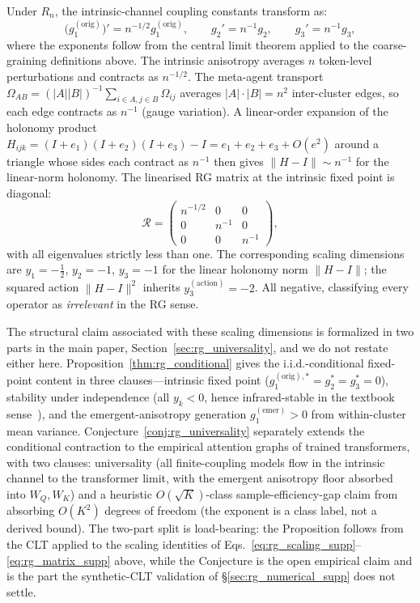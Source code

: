 \documentclass[twoside,11pt]{article}
\begin{document}
Under $R_n$, the intrinsic-channel coupling constants transform as:
\begin{equation}
\bigl(g_1^{(\mathrm{orig})}\bigr)' = n^{-1/2} g_1^{(\mathrm{orig})}, \qquad g_2' = n^{-1} g_2, \qquad g_3' = n^{-1} g_3,
\label{eq:rg_scaling_supp}
\end{equation}
where the exponents follow from the central limit theorem applied to the coarse-graining definitions above. The intrinsic anisotropy averages $n$ token-level perturbations and contracts as $n^{-1/2}$. The meta-agent transport $\Omega_{AB} = (|A||B|)^{-1}\sum_{i\in A, j\in B}\Omega_{ij}$ averages $|A|\cdot|B| = n^2$ inter-cluster edges, so each edge contracts as $n^{-1}$ (gauge variation). A linear-order expansion of the holonomy product $H_{ijk} = (I + e_1)(I + e_2)(I + e_3) - I = e_1 + e_2 + e_3 + O(e^2)$ around a triangle whose sides each contract as $n^{-1}$ then gives $\|H - I\| \sim n^{-1}$ for the linear-norm holonomy. The linearised RG matrix at the intrinsic fixed point is diagonal:
\begin{equation}
\mathcal{R} = \begin{pmatrix} n^{-1/2} & 0 & 0 \\ 0 & n^{-1} & 0 \\ 0 & 0 & n^{-1} \end{pmatrix},
\label{eq:rg_matrix_supp}
\end{equation}
with all eigenvalues strictly less than one. The corresponding scaling dimensions are $y_1 = -\tfrac{1}{2}$, $y_2 = -1$, $y_3 = -1$ for the linear holonomy norm $\|H-I\|$; the squared action $\|H-I\|^2$ inherits $y_3^{(\mathrm{action})} = -2$. All negative, classifying every operator as \emph{irrelevant} in the RG sense.

The structural claim associated with these scaling dimensions is formalized in two parts in the main paper, Section~\ref{sec:rg_universality}, and we do not restate either here. Proposition~\ref{thm:rg_conditional} gives the i.i.d.-conditional fixed-point content in three clauses---intrinsic fixed point ($g_1^{(\mathrm{orig}),*} = g_2^* = g_3^* = 0$), stability under independence (all $y_k < 0$, hence infrared-stable in the textbook sense~\citep{Cardy1996,goldenfeld1992lectures}), and the emergent-anisotropy generation $g_1^{(\mathrm{emer})} > 0$ from within-cluster mean variance. Conjecture~\ref{conj:rg_universality} separately extends the conditional contraction to the empirical attention graphs of trained transformers, with two clauses: universality (all finite-coupling models flow in the intrinsic channel to the transformer limit, with the emergent anisotropy floor absorbed into $W_Q, W_K$) and a heuristic $O(\sqrt{K})$-class sample-efficiency-gap claim from absorbing $O(K^2)$ degrees of freedom (the exponent is a class label, not a derived bound). The two-part split is load-bearing: the Proposition follows from the CLT applied to the scaling identities of Eqs.~\eqref{eq:rg_scaling_supp}--\eqref{eq:rg_matrix_supp} above, while the Conjecture is the open empirical claim and is the part the synthetic-CLT validation of §\ref{sec:rg_numerical_supp} does not settle.
\end{document}
